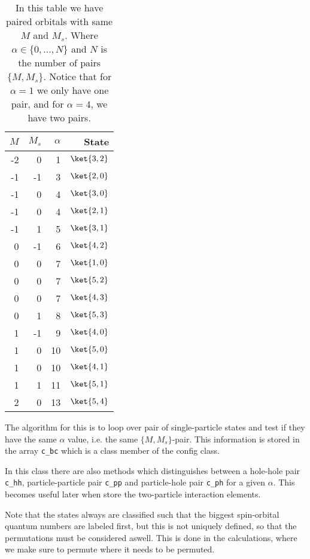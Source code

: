 \begin{table}[H]
\centering 
\begin{tabular}{rrrr}
\toprule
$M$ & $M_s$ & $\alpha$ & State\\
\midrule
 -2 &  0 &  1  &$\ket{3,2}$ \\
 -1 & -1  & 3  &$\ket{2,0}$ \\
 -1 &  0 &  4  &$\ket{3,0}$ \\
 -1 &  0  & 4  &$\ket{2,1}$ \\
 -1 &  1 &  5  &$\ket{3,1}$ \\
  0 & -1 &  6  &$\ket{4,2}$ \\
  0 &  0 &  7  &$\ket{1,0}$ \\
  0 &  0 & 7   &$\ket{5,2}$ \\
  0 &  0 & 7   &$\ket{4,3}$\\
  0 &  1 &  8  &$\ket{5,3}$\\
  1 & -1 &  9  &$\ket{4,0}$ \\
  1 &  0 & 10  &$\ket{5,0}$\\
  1 &  0 & 10  &$\ket{4,1}$\\
  1 &  1 &  11 &$\ket{5,1}$ \\
  2 &  0 & 13  &$\ket{5,4}$ \\
\bottomrule
\end{tabular}
\caption{In this table we have paired orbitals with same $M$ and $M_s$. Where $\alpha \in \{0,...,N\}$ and $N$ is the number of pairs $\{M,M_s\}$. Notice that for $\alpha = 1$ we only have one pair, and for $\alpha = 4$, we have two pairs.}
\label{tab:configpair}
\end{table}
%
The algorithm for this is to loop over pair of single-particle states and test if they have the same $\alpha$ value, i.e. the same $\{M,M_s\}$-pair. This information is stored in the array \texttt{c\_bc} which is a class member of the config class. 

In this class there are also methods which distinguishes between a hole-hole pair \texttt{c\_hh}, particle-particle pair \texttt{c\_pp} and particle-hole pair \texttt{c\_ph} for a given $\alpha$. This becomes useful later when store the two-particle interaction elements.
 
 Note that the states always are classified such that the biggest spin-orbital quantum numbers are labeled first, but this is not uniquely defined, so that the permutations must be considered aswell. This is done in the calculations, where we make sure to permute where it needs to be permuted. 
 
